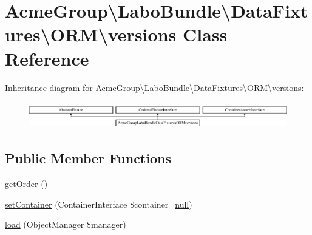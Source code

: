 \hypertarget{class_acme_group_1_1_labo_bundle_1_1_data_fixtures_1_1_o_r_m_1_1versions}{\section{Acme\+Group\textbackslash{}Labo\+Bundle\textbackslash{}Data\+Fixtures\textbackslash{}O\+R\+M\textbackslash{}versions Class Reference}
\label{class_acme_group_1_1_labo_bundle_1_1_data_fixtures_1_1_o_r_m_1_1versions}
}
Inheritance diagram for Acme\+Group\textbackslash{}Labo\+Bundle\textbackslash{}Data\+Fixtures\textbackslash{}O\+R\+M\textbackslash{}versions\+:\begin{figure}[H]
\begin{center}
\leavevmode
\includegraphics[height=1.174004cm]{class_acme_group_1_1_labo_bundle_1_1_data_fixtures_1_1_o_r_m_1_1versions}
\end{center}
\end{figure}
\subsection*{Public Member Functions}
\begin{DoxyCompactItemize}
\item 
\hyperlink{class_acme_group_1_1_labo_bundle_1_1_data_fixtures_1_1_o_r_m_1_1versions_a90d9e61b3ccb96eaaa8d19667d31037f}{get\+Order} ()
\item 
\hyperlink{class_acme_group_1_1_labo_bundle_1_1_data_fixtures_1_1_o_r_m_1_1versions_a9eead5dafa8ae43703cced19f6bd8ffa}{set\+Container} (Container\+Interface \$container=\hyperlink{validate_8js_afb8e110345c45e74478894341ab6b28e}{null})
\item 
\hyperlink{class_acme_group_1_1_labo_bundle_1_1_data_fixtures_1_1_o_r_m_1_1versions_aeec21a167a56c4bb9489ac0549a98ec6}{load} (Object\+Manager \$manager)
\end{DoxyCompactItemize}


